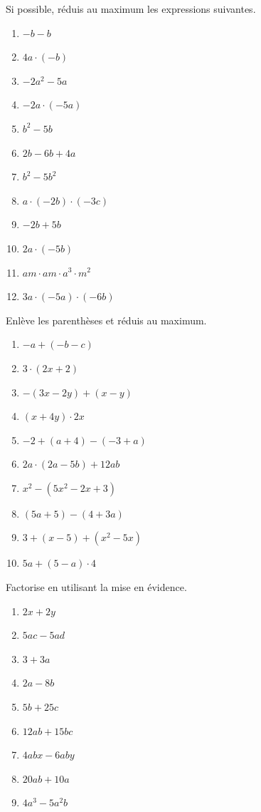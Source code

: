 \documentclass[12pt,parskip=half-, twoside=semi]{scrartcl}
\begin{document}
\begin{exercise}
    Si possible, réduis au maximum les expressions suivantes.
    \begin{enumerate}[cols=3]
        \item $-b-b$
        \item $4a\cdot \left(-b\right)$
        \item $-2a^2 - 5a$
        \item $-2a\cdot \left(-5a\right)$
        \item $b^2-5b$
        \item $2b-6b+4a$
        \item $b^2 - 5b^2$
        \item $a\cdot \left(-2b\right) \cdot \left(-3c\right)$
        \item $-2b + 5b$
        \item $2a\cdot \left(-5b\right)$
        \item $am \cdot am \cdot a^3 \cdot m^2$
        \item $3a\cdot \left(-5a\right) \cdot \left(-6b\right)$
    \end{enumerate}
\end{exercise}

\begin{exercise}
    Enlève les parenthèses et réduis au maximum.
    \begin{enumerate}[cols=2]
        \item $-a + (-b - c) $
        \item $3\cdot (2x + 2 )$
        \item $- (3x - 2y) +(x - y) $
        \item $(x + 4y) \cdot 2x $
        \item $-2 + (a + 4) - (-3 + a)$
        \item $2a\cdot (2a-5b)+12ab $
        \item $x^2-(5x^2 -2x + 3) $ 
        \item $(5a +5)- (4 + 3a) $ 
        \item $3+(x-5)+(x^2-5x) $ 
        \item $5a+(5-a)\cdot 4 $
    \end{enumerate}
\end{exercise}

\begin{exercise}
    Factorise en utilisant la mise en évidence.
    \begin{enumerate}[cols=3]
        \item $2x + 2y$
        \item $5ac - 5ad $
        \item $3+ 3a $
        \item $2a - 8b $
        \item $5b + 25c$
        \item $12 ab+ 15 bc$
        \item $4 abx - 6 aby $
        \item $20 ab + 10a$
        \item $4a^3 - 5a^2b$
    \end{enumerate}
\end{exercise}
\end{document}
